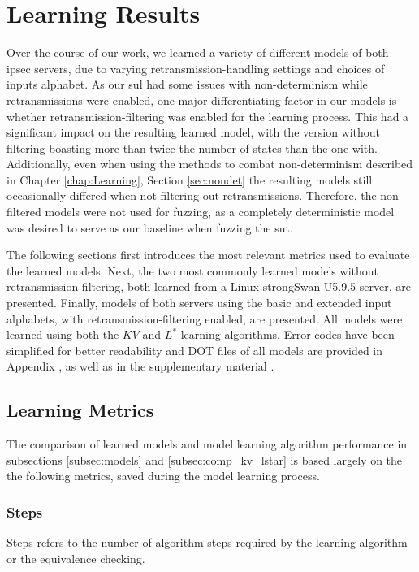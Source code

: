 \section{Learning Results} \label{sec:learnresults}
Over the course of our work, we learned a variety of different models of both \ac{ipsec} servers, due to varying retransmission-handling settings and choices of inputs alphabet. As our \ac{sul} had some issues with non-determinism while retransmissions were enabled, one major differentiating factor in our models is whether retransmission-filtering was enabled for the learning process. This had a significant impact on the resulting learned model, with the version without filtering boasting more than twice the number of states than the one with. Additionally, even when using the methods to combat non-determinism described in Chapter \ref{chap:Learning}, Section \ref{sec:nondet} the resulting models still occasionally differed when not filtering out retransmissions. Therefore, the non-filtered models were not used for fuzzing, as a completely deterministic model was desired to serve as our baseline when fuzzing the \ac{sut}.

The following sections first introduces the most relevant metrics used to evaluate the learned models. Next, the two most commonly learned models without retransmission-filtering, both learned from a Linux strongSwan U5.9.5 server, are presented. Finally, models of both servers using the basic and extended input alphabets, with retransmission-filtering enabled, are presented. All models were learned using both the $KV$ and $L^*$ learning algorithms. Error codes have been simplified for better readability and DOT files of all models are provided in Appendix , as well as in the supplementary material .

\newpage

\subsection{Learning Metrics} \label{subsec:metrics}
The comparison of learned models and model learning algorithm performance in subsections \ref{subsec:models} and \ref{subsec:comp_kv_lstar} is based largely on the the following metrics, saved during the model learning process.

\subsubsection*{Steps}
Steps refers to the number of algorithm steps required by the learning algorithm or the equivalence checking.

